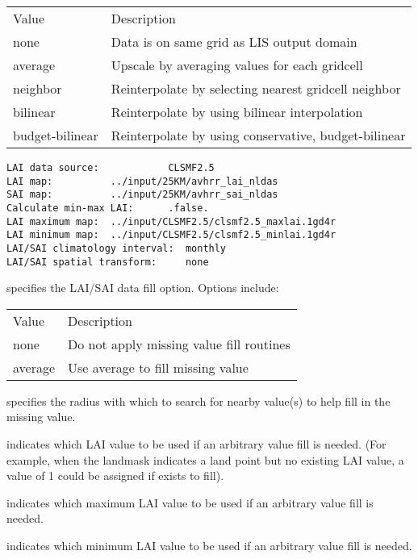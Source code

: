  \begin{tabular}{ll}
 Value   & Description                                   \\
 none    & Data is on same grid as LIS output domain     \\
 average         & Upscale by averaging values for each gridcell        \\
 neighbor        & Reinterpolate by selecting nearest gridcell neighbor \\
 bilinear        & Reinterpolate by using bilinear interpolation        \\
 budget-bilinear & Reinterpolate by using conservative, budget-bilinear \\
 \end{tabular}
 

 \begin{Verbatim}[frame=single]
LAI data source:            CLSMF2.5
LAI map:          ../input/25KM/avhrr_lai_nldas               
SAI map:          ../input/25KM/avhrr_sai_nldas           
Calculate min-max LAI:      .false.
LAI maximum map:  ../input/CLSMF2.5/clsmf2.5_maxlai.1gd4r
LAI minimum map:  ../input/CLSMF2.5/clsmf2.5_minlai.1gd4r
LAI/SAI climatology interval:  monthly 
LAI/SAI spatial transform:     none
 \end{Verbatim}

 
  specifies the LAI/SAI
 data fill option.  Options include:

 \begin{tabular}{ll}
 Value   & Description                              \\
 none    & Do not apply missing value fill routines \\
 average & Use average to fill missing value        \\
 \end{tabular}

  specifies the radius with which
 to search for nearby value(s) to help fill in the missing value.

  indicates which LAI 
 value to be used if an arbitrary value fill is needed. 
 (For example, when the landmask indicates a land point but no existing 
 LAI value, a value of 1 could be assigned if 
 exists to fill).
  
  indicates which maximum LAI 
 value to be used if an arbitrary value fill is needed. 
 
  indicates which minimum LAI 
 value to be used if an arbitrary value fill is needed. 

